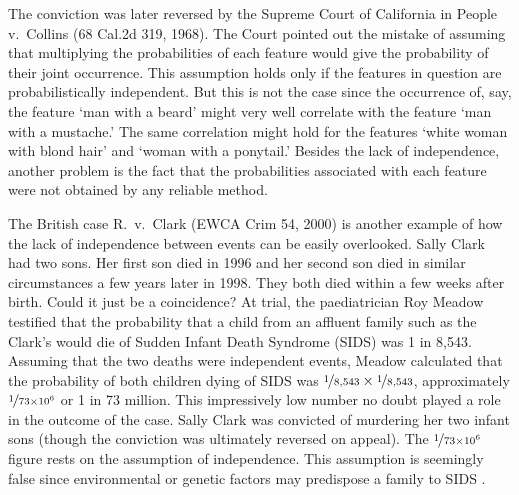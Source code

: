\documentclass{article}
\begin{document}
The conviction was later reversed by the Supreme Court of California in People v.\ Collins (68 Cal.2d 319, 1968). 
The Court pointed out the mistake
of assuming that multiplying the probabilities of each feature would give the probability of their joint occurrence. This assumption holds only if the features in question are probabilistically independent. 
But this is not the case since the occurrence of, say, the feature `man with a beard' might very well correlate with the feature `man with a mustache.' The same correlation might hold for the features 
 `white woman with blond hair' and
 `woman with a ponytail.' Besides the lack of independence, another problem is the fact that 
the probabilities associated with each feature were not obtained by any reliable method. 

The British case  
R.\ v.\ Clark (EWCA Crim 54, 2000) 
is another example of how 
the lack of independence between events can be easily overlooked. %
Sally Clark had two sons. Her first son died in 1996 and her second son died in similar circumstances a few years later in 1998. They both died within a few weeks  after birth. Could it just be a coincidence? At trial,  the paediatrician Roy Meadow testified that the probability that a child from an affluent family such as the Clark's would die of Sudden Infant Death Syndrome (SIDS) was 1 in 8,543. Assuming that the two deaths were independent events, Meadow calculated that the probability of both children dying of SIDS was $\nicefrac{1}{8,543}\times \nicefrac{1}{8,543}$, approximately $\nicefrac{1}{73\times 10^6}$ or 1 in 73 million.
This impressively low number no doubt played a role in the outcome of the case. 
Sally Clark was convicted of murdering her two infant sons (though the conviction was ultimately reversed on appeal). 
The $\nicefrac{1}{73\times 10^6}$ figure rests on the assumption of independence. This assumption is seemingly false since environmental or genetic factors may predispose a family to SIDS \citep[for a fuller discussion of this point, see][]{Dawid02, sasardic207, Barker2017}.
\end{document}

